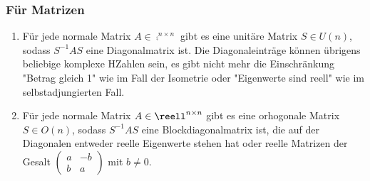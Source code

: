 \documentclass{kit}
\begin{document}
    \subsubsection{Für Matrizen}
      \begin{enumerate}
        \item Für jede normale Matrix $A\in\comp^{n\times n}$ gibt es eine unitäre Matrix $S\in U(n)$, sodass $S^{-1}AS$
          eine Diagonalmatrix ist. Die Diagonaleinträge können übrigens beliebige komplexe HZahlen sein, es gibt nicht mehr
          die Einschränkung "Betrag gleich 1" wie im Fall der Isometrie oder "Eigenwerte sind reell" wie im 
          selbstadjungierten Fall.
        \item Für jede normale Matrix $A\in\reell^{n\times n}$ gibt es eine orhogonale Matrix $S\in O(n)$, sodass $S^{-1}AS$
          eine Blockdiagonalmatrix ist, die auf der Diagonalen entweder reelle Eigenwerte stehen hat oder reelle Matrizen
          der Gesalt $\begin{pmatrix}a & -b \\ b & a\end{pmatrix}$ mit $b\neq0$.
      \end{enumerate}
\end{document}
